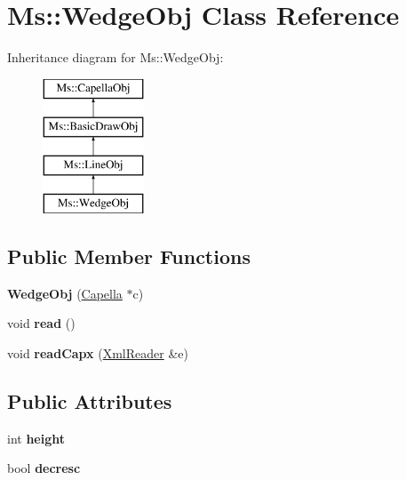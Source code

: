 \hypertarget{class_ms_1_1_wedge_obj}{}\section{Ms\+:\+:Wedge\+Obj Class Reference}
\label{class_ms_1_1_wedge_obj}
Inheritance diagram for Ms\+:\+:Wedge\+Obj\+:\begin{figure}[H]
\begin{center}
\leavevmode
\includegraphics[height=4.000000cm]{class_ms_1_1_wedge_obj}
\end{center}
\end{figure}
\subsection*{Public Member Functions}
\begin{DoxyCompactItemize}
\item 
\mbox{\label{class_ms_1_1_wedge_obj_a95a4ddd0d6dcc15fb8b8822875bd7118}} 
{\bfseries Wedge\+Obj} (\hyperlink{class_ms_1_1_capella}{Capella} $\ast$c)
\item 
\mbox{\label{class_ms_1_1_wedge_obj_a8eee24bdb3da717ca68eb9e51478bcff}} 
void {\bfseries read} ()
\item 
\mbox{\label{class_ms_1_1_wedge_obj_a3fdcaee5a71dec6887ee985eaaa3af67}} 
void {\bfseries read\+Capx} (\hyperlink{class_ms_1_1_xml_reader}{Xml\+Reader} \&e)
\end{DoxyCompactItemize}
\subsection*{Public Attributes}
\begin{DoxyCompactItemize}
\item 
\mbox{\label{class_ms_1_1_wedge_obj_a15f5fe04f4c6d08366ccbb3bf9214243}} 
int {\bfseries height}
\item 
\mbox{\label{class_ms_1_1_wedge_obj_a4ba635afd29c0b9eaa69b60727a51149}} 
bool {\bfseries decresc}
\end{DoxyCompactItemize}
